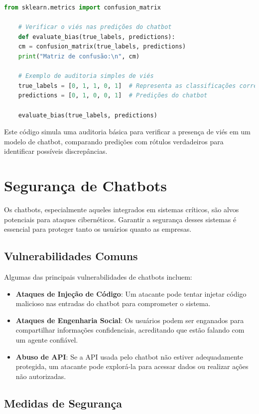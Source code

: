 \documentclass[14pt,a4paper,oneside]{book}
\begin{document}
\begin{lstlisting}[language=Python]
	from sklearn.metrics import confusion_matrix
	
	# Verificar o viés nas predições do chatbot
	def evaluate_bias(true_labels, predictions):
	cm = confusion_matrix(true_labels, predictions)
	print("Matriz de confusão:\n", cm)
	
	# Exemplo de auditoria simples de viés
	true_labels = [0, 1, 1, 0, 1]  # Representa as classificações corretas
	predictions = [0, 1, 0, 0, 1]  # Predições do chatbot
	
	evaluate_bias(true_labels, predictions)
\end{lstlisting}

Este código simula uma auditoria básica para verificar a presença de viés em um modelo de chatbot, comparando predições com rótulos verdadeiros para identificar possíveis discrepâncias.

\section{Segurança de Chatbots}

Os chatbots, especialmente aqueles integrados em sistemas críticos, são alvos potenciais para ataques cibernéticos. Garantir a segurança desses sistemas é essencial para proteger tanto os usuários quanto as empresas.

\subsection{Vulnerabilidades Comuns}

Algumas das principais vulnerabilidades de chatbots incluem:

\begin{itemize}
	\item \textbf{Ataques de Injeção de Código}: Um atacante pode tentar injetar código malicioso nas entradas do chatbot para comprometer o sistema.
	\item \textbf{Ataques de Engenharia Social}: Os usuários podem ser enganados para compartilhar informações confidenciais, acreditando que estão falando com um agente confiável.
	\item \textbf{Abuso de API}: Se a API usada pelo chatbot não estiver adequadamente protegida, um atacante pode explorá-la para acessar dados ou realizar ações não autorizadas.
\end{itemize}

\subsection{Medidas de Segurança}
\end{document}
